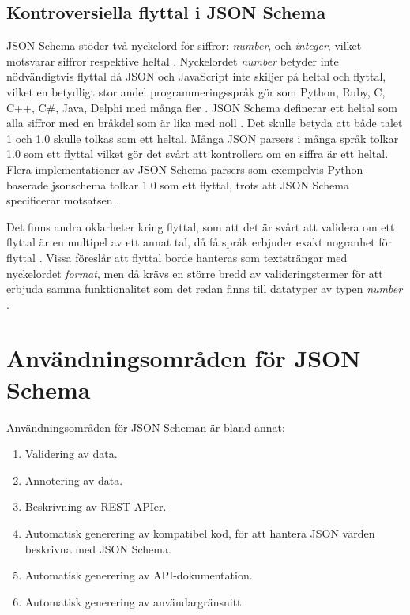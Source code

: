 \subsection{Kontroversiella flyttal i JSON Schema}
\label{sec:teori:schema:float}

JSON Schema stöder två nyckelord för siffror: \textit{number}, och \textit{integer}, vilket motsvarar siffror respektive heltal \cite{Andrews}. Nyckelordet \textit{number} betyder inte nödvändigtvis flyttal då JSON och JavaScript inte skiljer på heltal och flyttal, vilket en betydligt stor andel programmeringsspråk gör som Python, Ruby, C, C++, C\#, Java, Delphi med många fler \cite{Embarcadero,Oracle,Microsofta,GNU,GNUa,Britt,Britta,PythonSoftwareFoundation2018,ECMA2013,EcmaInternational2017}. JSON Schema definerar ett heltal som alla siffror med en bråkdel som är lika med noll \cite{Andrews}. Det skulle betyda att både talet 1 och 1.0 skulle tolkas som ett heltal. Många JSON parsers i många språk tolkar 1.0 som ett flyttal vilket gör det svårt att kontrollera om en siffra är ett heltal. Flera implementationer av JSON Schema parsers som exempelvis Python-baserade jsonschema tolkar 1.0 som ett flyttal, trots att JSON Schema specificerar motsatsen \cite{SpaceTelescopeScienceInstitute2016}.

Det finns andra oklarheter kring flyttal, som att det är svårt att validera om ett flyttal är en multipel av ett annat tal, då få språk erbjuder exakt nogranhet för flyttal \cite{Cederqvist2017}. Vissa föreslår att flyttal borde hanteras som textsträngar med nyckelordet \textit{format}, men då krävs en större bredd av valideringstermer för att erbjuda samma funktionalitet som det redan finns till datatyper av typen \textit{number} \cite{Poberezkin,Faassen}.

\section{Användningsområden för JSON Schema}
\label{sec:teori:schema-användningsområden}
Användningsområden för JSON Scheman är bland annat:

\begin{enumerate}
	\item Validering av data.
	\item Annotering av data.
	\item Beskrivning av REST APIer.
	\item Automatisk generering av kompatibel kod, för att hantera JSON värden beskrivna med JSON Schema.
	\item Automatisk generering av API-dokumentation.
	\item Automatisk generering av användargränsnitt.
\end{enumerate}

